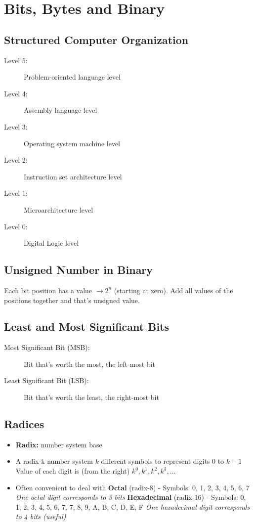 \section{Bits, Bytes and Binary}
\subsection{Structured Computer Organization}
\begin{description}
	\item[Level 5:] Problem-oriented language level
	\item[Level 4:] Assembly language level
	\item[Level 3:] Operating system machine level
	\item[Level 2:] Instruction set architecture level
	\item[Level 1:] Microarchitecture level
	\item[Level 0:] Digital Logic level
\end{description}

\subsection{Unsigned Number in Binary}
Each bit position has a value $\rightarrow 2^n$ (starting at zero). Add all values of the positions together and that's unsigned value.

\subsection{Least and Most Significant Bits}
\begin{description}
	\item[Most Significant Bit (MSB):] Bit that's worth the most, the left-most bit
	\item[Least Significant Bit (LSB):] Bit that's worth the least, the right-most bit
\end{description}

\subsection{Radices}
\begin{itemize}
	\item \textbf{Radix:} number system base
	\item A radix-k number system
	\subitem $k$ different symbols to represent digits 0 to $k-1$
	\subitem Value of each digit is (from the right) $k^0, k^1, k^2, k^3, \ldots$
	\item Often convenient to deal with
	\subitem\textbf{Octal} (radix-8) - Symbols: 0, 1, 2, 3, 4, 5, 6, 7
	\subsubitem\textit{One octal digit corresponds to 3 bits}
	\subitem\textbf{Hexadecimal} (radix-16) - Symbols: 0, 1, 2, 3, 4, 5, 6, 7, 7, 8, 9, A, B, C, D, E, F
	\subsubitem\textit{One hexadecimal digit corresponds to 4 bits (useful)}
\end{itemize}

